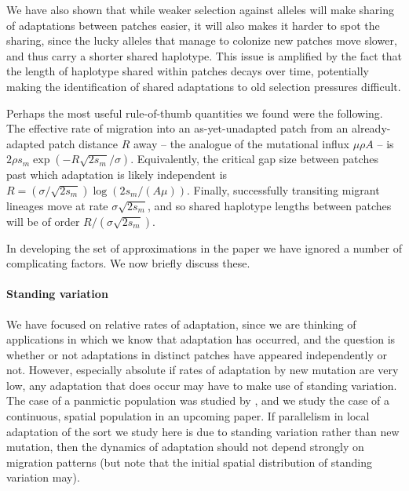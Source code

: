 \documentclass{article}
\newcommand{\citet}[1]{\cite{#1}}
\begin{document}
We have also shown that
while weaker selection against alleles will make sharing 
of adaptations between patches easier, 
it will also makes it harder to spot the sharing,
since the lucky alleles that manage to colonize new patches move slower,
and thus carry a shorter shared haplotype.
This issue is amplified by the fact that the length of haplotype
shared within patches decays over time, potentially making the
identification of shared adaptations to old selection pressures difficult.

Perhaps the most useful rule-of-thumb quantities we found were the following.
The effective rate of migration into an as-yet-unadapted patch from an already-adapted patch distance $R$ away 
-- the analogue of the mutational influx $\mu \rho A$ --
is $2 \rho s_m \exp(- R \sqrt{2 s_m} / \sigma)$.
Equivalently, the critical gap size between patches past which adaptation is likely independent
is $R = (\sigma/\sqrt{2s_m}) \log(2s_m/(A \mu))$.
Finally, successfully transiting migrant lineages move at rate $\sigma \sqrt{2s_m}$,
and so shared haplotype lengths between patches will be of order $R/(\sigma \sqrt{2s_m})$.

In developing the set of approximations in the paper we have ignored a
number of complicating factors. We now briefly discuss these.

\paragraph{Standing variation} 
We have focused on relative rates of adaptation,
since we are thinking of applications in which we know that adaptation has occurred,
and the question is whether or not adaptations in distinct patches
have appeared independently or not.
However, especially absolute if rates of adaptation by new mutation are very low,
any adaptation that does occur may have to make use of standing variation.
The case of a panmictic population was studied by \citet{softsweepsI},
and we study the case of a continuous, spatial population in an upcoming paper.
If parallelism in local adaptation of the sort we study here is due to standing variation
rather than new mutation,
then the dynamics of adaptation should not depend strongly on migration patterns
(but note that the initial spatial distribution of standing variation may).
\end{document}
